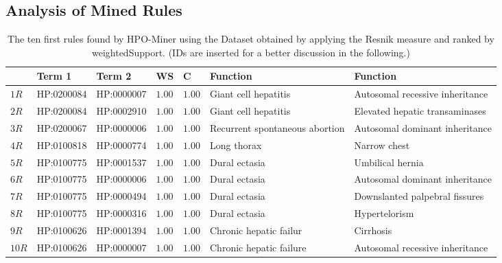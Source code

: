 \documentclass{article}
\theoremstyle{definition}
\begin{document}
\subsection{Analysis of Mined Rules}


\begin{table}[ht]

\caption{The ten first rules found by HPO-Miner using the Dataset obtained by applying the Resnik measure and ranked by weightedSupport. (IDs are inserted for a better discussion in the following.) }
\label{tab:Resnik}
\begin{tabular}{|p{0.5cm}|l|l|p{0.5cm}|p{0.5cm}|p{2.0cm}|p{2.0cm}|}
\hline 
\textbf{}&\textbf{Term 1}& \textbf{Term 2} & \textbf{WS} & \textbf{C} &\textbf{Function} & \textbf{Function }\\ 
\hline
$1R$ & HP:0200084 & HP:0000007 &$1.00$&$1.00$&Giant cell hepatitis&Autosomal recessive inheritance\\
\hline
$2R$&HP:0200084&HP:0002910&$1.00$&$1.00$&Giant cell hepatitis&Elevated hepatic transaminases\\
\hline
$3R$&HP:0200067&HP:0000006&$1.00$&$1.00$&Recurrent spontaneous abortion&Autosomal dominant inheritance\\
\hline
$4R$&HP:0100818&HP:0000774&$1.00$&$1.00$&Long thorax&Narrow chest\\
\hline
$5R$&HP:0100775&HP:0001537&$1.00$&$1.00$&Dural ectasia&Umbilical hernia\\
\hline
$6R$&HP:0100775&HP:0000006&$1.00$&$1.00$&Dural ectasia&Autosomal dominant inheritance\\
\hline
$7R$&HP:0100775&HP:0000494&$1.00$&$1.00$&Dural ectasia&Downslanted palpebral fissures\\
\hline
$8R$&HP:0100775&HP:0000316&$1.00$&$1.00$&Dural ectasia&Hypertelorism\\
\hline
$9R$&HP:0100626&HP:0001394&$1.00$&$1.00$&Chronic hepatic failur&Cirrhosis\\
\hline
$10R$&HP:0100626&HP:0000007&$1.00$&$1.00$&Chronic hepatic failure&Autosomal recessive inheritance\\
\hline
\end{tabular}
\end{table}
\end{document}
